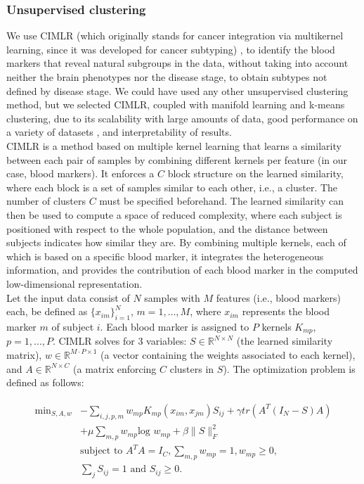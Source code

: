 \subsubsection{Unsupervised clustering}

We use CIMLR (which originally stands for cancer integration via multikernel learning, since it was developed for cancer subtyping) \cite{Ramazzotti2018,Wang2017a}, to identify the blood markers that reveal natural subgroups in the data, without taking into account neither the brain phenotypes nor the disease stage, to obtain subtypes not defined by disease stage. We could have used any other unsupervised clustering method, but we selected CIMLR, coupled with manifold learning and k-means clustering, due to its scalability with large amounts of data, good performance on a variety of datasets \cite{Ramazzotti2018,Wang2017a}, and interpretability of results. \\

CIMLR is a method based on multiple kernel learning that learns a similarity between each pair of samples by combining different kernels per feature (in our case, blood markers). It enforces a $C$ block structure on the learned similarity, where each block is a set of samples similar to each other, i.e., a cluster. The number of clusters $C$ must be specified beforehand. The learned similarity can then be used to compute a space of reduced complexity, where each subject is positioned with respect to the whole population, and the distance between subjects indicates how similar they are. By combining multiple kernels, each of which is based on a specific blood marker, it integrates the heterogeneous information, and provides the contribution of each blood marker in the computed low-dimensional representation. \\

Let the input data consist of $N$ samples with $M$ features (i.e., blood markers) each, be defined as $\{x_{im}\}^N_{i=1}$, $m=1,\ldots, M$, where $x_{im}$ represents the blood marker $m$ of subject $i$. Each blood marker is assigned to $P$ kernels $K_{mp}$, $p=1,\ldots, P$. CIMLR solves for 3 variables: $S \in \mathbb{R}^{N\times N}$ (the learned similarity matrix), $w \in \mathbb{R}^{M\cdot P \times 1}$ (a vector containing the weights associated to each kernel), and $A \in \mathbb{R}^{N\times C}$ (a matrix enforcing $C$ clusters in $S$). The  optimization problem is defined as follows:

\begin{align}
\begin{split}\label{eq:1}
   \text{min}_{S,A,w} {}&-\sum_{i,j,p,m}w_{mp}K_{mp}(x_{im},x_{jm})S_{ij} + \gamma tr(A^T(I_N-S)A)\\
   {}&+ \mu\sum_{m,p} w_{mp} \text{log } w_{mp} + \beta \|S\|^2_F  \\
   {}&\text{subject to } A^TA = I_C, \sum_{m,p}  w_{mp} = 1,  w_{mp} \geq 0,\\
   {}&\sum_j S_{ij} = 1 \text{ and } S_{ij} \geq 0.
\end{split}
\end{align}

